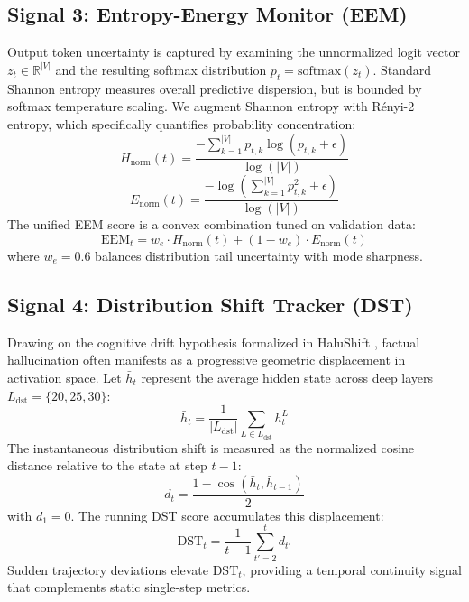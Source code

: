\documentclass[journal]{IEEEtran}
\begin{document}
\subsection{Signal 3: Entropy-Energy Monitor (EEM)}
Output token uncertainty is captured by examining the unnormalized logit vector $z_t \in \mathbb{R}^{|V|}$ and the resulting softmax distribution $p_t = \text{softmax}(z_t)$. Standard Shannon entropy measures overall predictive dispersion, but is bounded by softmax temperature scaling. We augment Shannon entropy with R\'enyi-2 entropy, which specifically quantifies probability concentration:
\begin{equation}
    H_{\text{norm}}(t) = \frac{-\sum_{k=1}^{|V|} p_{t, k} \log(p_{t, k} + \epsilon)}{\log(|V|)}
\end{equation}
\begin{equation}
    E_{\text{norm}}(t) = \frac{-\log\left(\sum_{k=1}^{|V|} p_{t, k}^2 + \epsilon\right)}{\log(|V|)}
\end{equation}
The unified EEM score is a convex combination tuned on validation data:
\begin{equation}
    \text{EEM}_t = w_e \cdot H_{\text{norm}}(t) + (1 - w_e) \cdot E_{\text{norm}}(t)
\end{equation}
where $w_e = 0.6$ balances distribution tail uncertainty with mode sharpness.

\subsection{Signal 4: Distribution Shift Tracker (DST)}
Drawing on the cognitive drift hypothesis formalized in HaluShift \cite{dasgupta2025hallushift}, factual hallucination often manifests as a progressive geometric displacement in activation space. Let $\bar{h}_t$ represent the average hidden state across deep layers $L_{\text{dst}} = \{20, 25, 30\}$:
\begin{equation}
    \bar{h}_t = \frac{1}{|L_{\text{dst}}|} \sum_{L \in L_{\text{dst}}} h_t^L
\end{equation}
The instantaneous distribution shift is measured as the normalized cosine distance relative to the state at step $t-1$:
\begin{equation}
    d_t = \frac{1 - \cos(\bar{h}_t, \bar{h}_{t-1})}{2}
\end{equation}
with $d_1 = 0$. The running DST score accumulates this displacement:
\begin{equation}
    \text{DST}_t = \frac{1}{t-1} \sum_{t'=2}^t d_{t'}
\end{equation}
Sudden trajectory deviations elevate $\text{DST}_t$, providing a temporal continuity signal that complements static single-step metrics.
\end{document}
